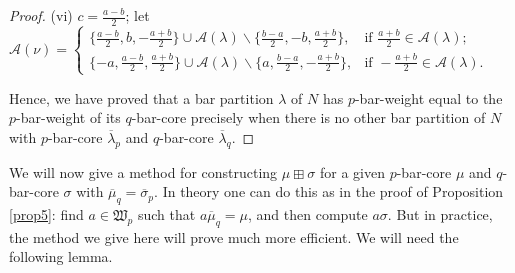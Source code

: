 \documentclass[ALCO, Unicode,published]{cedram}
\begin{document}
\begin{proof}
(vi) $c=\tfrac{a-b}{2}$; \newline
let $\mathcal{A}(\nu)=\begin{cases}
\{\tfrac{a-b}{2},b,-\tfrac{a+b}{2}\}\cup\mathcal{A}(\lambda)\backslash\{\tfrac{b-a}{2},-b,\tfrac{a+b}{2}\},&\text{if }\tfrac{a+b}{2}\in\mathcal{A}(\lambda);\\
\{-a,\tfrac{a-b}{2},\tfrac{a+b}{2}\}\cup\mathcal{A}(\lambda)\backslash\{a,\tfrac{b-a}{2},-\tfrac{a+b}{2}\},&\text{if }-\tfrac{a+b}{2}\in\mathcal{A}(\lambda).\end{cases}$ 

Hence, we have proved that a bar partition $\lambda$ of $N$ has $p$-bar-weight equal to the $p$-bar-weight of its $q$-bar-core precisely when there is no other bar partition of $N$ with $p$-bar-core $\overline{\lambda}_p$ and $q$-bar-core $\overline{\lambda}_q$.
\end{proof}

We will now give a method for constructing $\mu\boxplus\sigma$ for a given $p$-bar-core $\mu$ and $q$-bar-core $\sigma$ with $\overline{\mu}_q=\overline{\sigma}_p$. In theory one can do this as in the proof of Proposition \ref{prop5}: find $a\in\mathfrak{W}_p$ such that $a\overline{\mu}_q=\mu$, and then compute $a\sigma$. But in practice, the method we give here will prove much more efficient. We will need the following lemma. 
\end{document}
